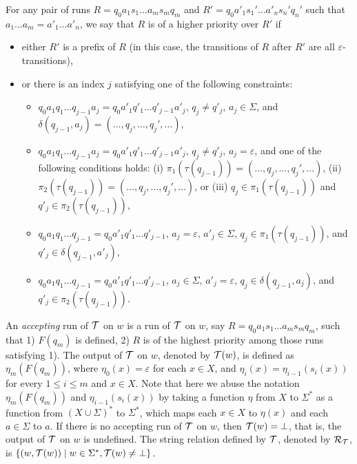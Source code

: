 For any pair of runs $R = q_0 a_1 s_1 \ldots a_m s_m q_m$ and $R' = q_0 a'_1
  s_1' \ldots a'_n s_n' q_n'$ such that $a_1 \ldots a_m = a'_1 \ldots a'_n$, we say that $R$ is of a higher priority over $R'$ if 
\begin{itemize}
	\item either $R'$ is a prefix of $R$ (in this case, the transitions of $R$ after $R'$ are all $\varepsilon$-transitions), 
	\item or there is an index $j$ satisfying one of the following constraints:
	\begin{itemize}
		\item $q_0 a_1 q_1 \ldots q_{j-1} a_j = q_0 a'_1 q'_1 \ldots q'_{j-1} a'_j$, $q_j \neq q'_j$, $a_j \in \Sigma$, and $\delta (q_{j - 1}, a_j) =(\ldots, q_j, \ldots, q_j', \ldots)$,
		\item $q_0 a_1 q_1 \ldots q_{j-1} a_j = q_0 a'_1 q'_1 \ldots q'_{j-1} a'_j$, $q_j \neq q'_j$, $a_j  = \varepsilon$,  and one of the following conditions holds: (i) $\pi_1(\tau(q_{j - 1})) = (\ldots, q_j, \ldots, q_j', \ldots)$, (ii) $\pi_2(\tau(q_{j - 1})) = (\ldots, q_j, \ldots, q_j', \ldots)$, or (iii) $q_j \in \pi_1(\tau(q_{j - 1}))$ and $q'_j \in \pi_2(\tau(q_{j-1}))$, 
		\item $q_0 a_1 q_1 \ldots q_{j-1}  = q_0 a'_1 q'_1 \ldots q'_{j-1} $, $a_j  = \varepsilon$, $a'_j  \in \Sigma$, $q_j \in \pi_1(\tau(q_{j - 1}))$, and $q'_j \in \delta(q_{j-1}, a'_j)$, 
		\item $q_0 a_1 q_1 \ldots q_{j-1}  = q_0 a'_1 q'_1 \ldots q'_{j-1} $, $a_j  \in \Sigma$, $a'_j  = \varepsilon$, $q_j \in \delta(q_{j - 1}, a_j)$, and $q'_j \in \pi_2(\tau(q_{j-1}))$.
	\end{itemize}
\end{itemize}
  
  
  
An \emph{accepting} run of $\mathcal{T}$ on $w$ is a run of $\mathcal{T}$ on $w$, say $R = q_0 a_1 s_1 \ldots a_m s_m q_m$, such that 1) $F(q_m)$ is defined, 2)  $R$ is of the highest priority among those runs satisfying 1). The output of $\mathcal{T}$ on $w$, denoted by $\mathcal{T}(w)$, is defined as $\eta_m(F(q_m))$, where $\eta_0(x) = \varepsilon$ for each $x \in X$, and $\eta_{i}(x) = \eta_{i-1}(s_{i}(x))$ for every $1 \le i \le m$ and $x \in X$. Note that here we abuse the notation $\eta_m(F(q_m))$ and $\eta_{i-1}(s_{i}(x))$ by taking a function $\eta$ from $X$ to $\Sigma^*$ as a function from $(X \cup \Sigma)^*$ to $\Sigma^*$, which maps each $x \in X$ to $\eta(x)$ and each $a \in \Sigma$ to $a$. If there is no accepting run of $\mathcal{T}$ on $w$, then $\mathcal{T}(w) = \bot$, that is, the output of $\mathcal{T}$ on $w$ is undefined. The string relation defined by $\mathcal{T}$, denoted by $\mathcal{R}_{\mathcal{T}}$,  is 
$\{(w, \mathcal{T}(w)) \mid w \in \Sigma^\ast, \mathcal{T}(w)  \neq \bot\}$.



